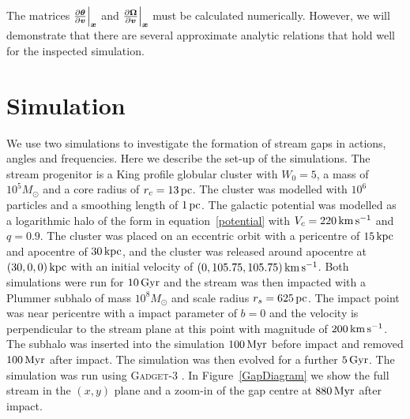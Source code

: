\documentclass[useAMS,usenatbib,fleqn,a4paper]{mn2e}
\def\kpc{\,{\rm kpc}}
\def\pc{\,{\rm pc}}
\def\kms{\,{\rm km\,s^{-1}}}
\def\Gyr{\,{\rm Gyr}}
\def\Myr{\,{\rm Myr}}
\newcommand{\bs}[1]{\bmath{#1}}
\begin{document}
The matrices $\frac{\upartial \bs{\theta}}{\upartial \bs{v}}\Big|_{\bs{x}}$ and $\frac{\upartial \bs{\Omega}}{\upartial \bs{v}}\Big|_{\bs{x}}$ must be calculated numerically. However, we will demonstrate that there are several approximate analytic relations that hold well for the inspected simulation.

\section{Simulation}\label{Sect::Simulation}
We use two simulations to investigate the formation of stream gaps in actions, angles and frequencies. Here we describe the set-up of the simulations. The stream progenitor is a King profile globular cluster with $W_0=5$, a mass of $10^5 M_\odot$ and a core radius of $r_c=13\pc$. The cluster was modelled with $10^6$ particles and a smoothing length of $1\pc$.
The galactic potential was modelled as a logarithmic halo of the form in equation~\eqref{potential} with $V_c = 220\kms$ and $q = 0.9$. The cluster was placed on an eccentric orbit with a pericentre of $15\kpc$ and apocentre of $30\kpc$, and the cluster was released around apocentre at $(30,0,0)\kpc$ with an initial velocity of $(0, 105.75, 105.75)\kms$. Both simulations were run for $10\Gyr$ and the stream was then impacted with a Plummer subhalo of mass $10^8M_\odot$ and scale radius $r_s=625\pc$. The impact point was near pericentre with a impact parameter of $b=0$ and the velocity is perpendicular to the stream plane at this point with magnitude of $200\kms$. The subhalo was inserted into the simulation $100\Myr$ before impact and removed $100\Myr$ after impact. The simulation was then evolved for a further $5\Gyr$. The simulation was run using \textsc{Gadget-3} \citep[which is an improved version of \textsc{Gadget-2},][]{Gadget2}. In Figure~\ref{GapDiagram} we show the full stream in the $(x,y)$ plane and a zoom-in of the gap centre at $880\Myr$ after impact.
\end{document}
